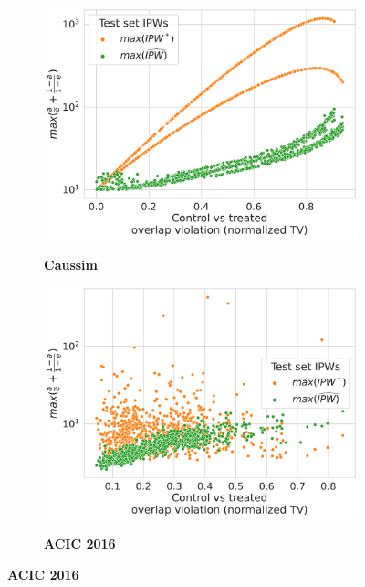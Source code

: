 \documentclass[11pt]{article}
\begin{document}
\begin{appendices}
    \begin{figure}[ht]
        \centering
        \begin{subfigure}[b]{0.47\textwidth}
            \centering
            \caption{\textbf{Caussim}}
            \includegraphics[width=\textwidth]{images/overlap_measure_caussim_max_ipw_vs_ntv.pdf}
            \label{apd:caussim:max_ipw_vs_ntv}
        \end{subfigure}
        \hfill
        \begin{subfigure}[b]{0.47\textwidth}
            \centering
            \caption{\textbf{ACIC 2016}}
            \includegraphics[width=\textwidth]{images/overlap_measure_acic_2016_max_ipw_vs_ntv.pdf}
            \label{apd:acic_2016:ntv_vs_max_ipw}
        \end{subfigure}

\end{figure}
\end{appendices}
\end{document}
